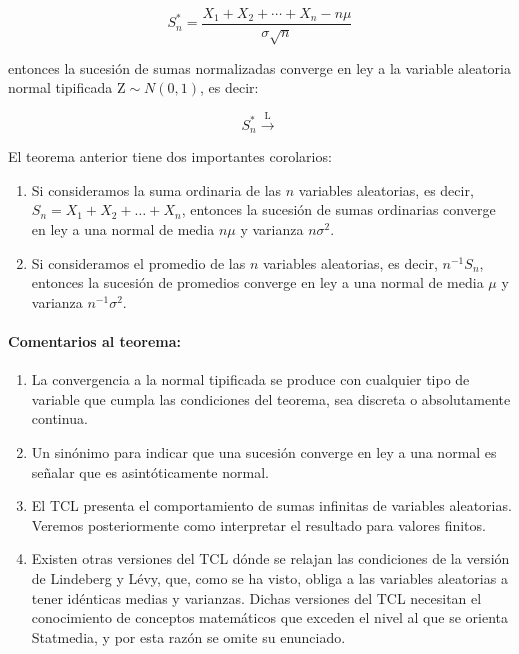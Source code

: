 \documentclass[
]{article}
\providecommand{\tightlist}{%
  \setlength{\itemsep}{0pt}\setlength{\parskip}{0pt}}
\begin{document}
\[
S_{n}^{*}=\frac{X_{1}+X_{2}+\cdots+X_{n}-n \mu}{\sigma \sqrt{n}}
\]

entonces la sucesión de sumas normalizadas converge en ley a la variable aleatoria normal tipificada \(\mathrm{Z} \sim N(0,1)\), es decir:

\[
S_{n}^{*} \xrightarrow{\mathrm{L}}
\]

El teorema anterior tiene dos importantes corolarios:

\begin{enumerate}
\def\labelenumi{\arabic{enumi}.}
\item
  Si consideramos la suma ordinaria de las \(n\) variables aleatorias, es decir, \(S_{n}=X_{1}+X_{2}+\ldots+X_{n}\), entonces la sucesión de sumas ordinarias converge en ley a una normal de media \(n \mu\) y varianza \(n \sigma^{2}\).
\item
  Si consideramos el promedio de las \(n\) variables aleatorias, es decir, \(n^{-1} S_{n}\), entonces la sucesión de promedios converge en ley a una normal de media \(\mu\) y varianza \(n^{-1} \sigma^{2}\).
\end{enumerate}

\paragraph{Comentarios al teorema:}\label{comentarios-al-teorema}

\begin{enumerate}
\def\labelenumi{\arabic{enumi}.}
\tightlist
\item
  La convergencia a la normal tipificada se produce con cualquier tipo de variable que cumpla las condiciones del teorema, sea discreta o absolutamente continua.
\item
  Un sinónimo para indicar que una sucesión converge en ley a una normal es señalar que es asintóticamente normal.
\item
  El TCL presenta el comportamiento de sumas infinitas de variables aleatorias. Veremos posteriormente como interpretar el resultado para valores finitos.
\item
  Existen otras versiones del TCL dónde se relajan las condiciones de la versión de Lindeberg y Lévy, que, como se ha visto, obliga a las variables aleatorias a tener idénticas medias y varianzas. Dichas versiones del TCL necesitan el conocimiento de conceptos matemáticos que exceden el nivel al que se orienta Statmedia, y por esta razón se omite su enunciado.
\end{enumerate}
\end{document}
